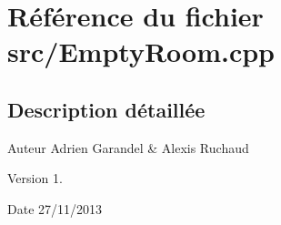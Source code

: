 \section{Référence du fichier src/\-Empty\-Room.cpp}
\label{_empty_room_8cpp}


\subsection{Description détaillée}
\begin{DoxyAuthor}{Auteur}
Adrien Garandel \& Alexis Ruchaud 
\end{DoxyAuthor}
\begin{DoxyVersion}{Version}
1. 
\end{DoxyVersion}
\begin{DoxyDate}{Date}
27/11/2013 
\end{DoxyDate}
